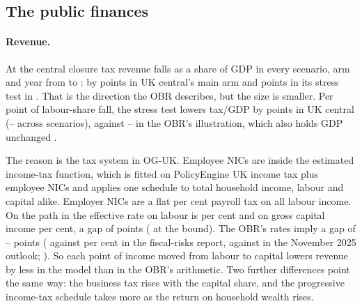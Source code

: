 \subsection{The public finances}
\label{sec:results-fiscal}

\paragraph{Revenue.} At the central closure tax revenue falls as a share of GDP in every scenario, arm and year from \genShockYear{} to \genLastFlowYear{}: by \genUkCentralMainTaxGdpPpCentralAbs{} points in UK central's main arm and \genUkCentralStressTaxGdpPpCentralAbs{} points in its stress test in \genHeadYear{}. That is the direction the OBR describes, but the size is smaller. Per point of labour-share fall, the stress test lowers tax/GDP by \genUkCentralStressTaxPerPpCentralAbs{} points in UK central (\genUkLowStressTaxPerPpCentralAbs{}--\genKorinekStressTaxPerPpCentralAbs{} across scenarios), against \genObrTaxPerPpLo{}--\genObrTaxPerPpHi{} in the OBR's illustration, which also holds GDP unchanged \citep[Box~4.1]{obr2026frs}.

The reason is the tax system in OG-UK. Employee NICs are inside the estimated income-tax function, which is fitted on PolicyEngine UK income tax plus employee NICs and applies one schedule to total household income, labour and capital alike. Employer NICs are a flat \genTauPayrollPct{} per cent payroll tax on all labour income. On the path in \genHeadYear{} the effective rate on labour is \genEffLabourPctCentral{} per cent and on gross capital income \genEffCapitalPctCentral{} per cent, a gap of \genEffWedgePpCentral{} points (\genEffWedgePpBound{} at the bound). The OBR's rates imply a gap of \genObrWedgeLo{}--\genObrWedgeHi{} points (\genObrFrsRateLabourPct{} against \genObrFrsRateProfitsPct{} per cent in the fiscal-risks report, \genObrEffRateLabourPct{} against \genObrEffRateProfitsPct{} in the November 2025 outlook; \citealp{obr2026frs,obr2025efonov}). So each point of income moved from labour to capital lowers revenue by less in the model than in the OBR's arithmetic. Two further differences point the same way: the business tax rises with the capital share, and the progressive income-tax schedule takes more as the return on household wealth rises.


